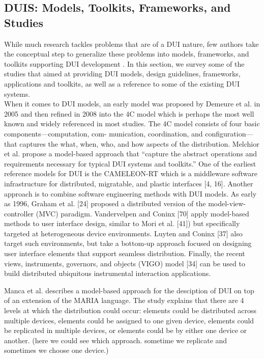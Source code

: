 \subsection{DUIS: Models, Toolkits, Frameworks, and Studies}
While much research tackles problems that are of a DUI nature, few authors take
the conceptual step to generalize these problems into models, frameworks, and
toolkits supporting DUI development \cite{elmqvist2011distributed}. In this
section, we survey some of the studies that aimed at providing DUI models,
design guidelines, frameworks, applications and toolkits, as well as a reference
to some of the existing DUI systems.\\

When it comes to DUI models, an early model was proposed by Demeure et al. in
2005 and then refined in 2008 \cite{demeure20084c} into the 4C model which is
perhaps the most well known and widely
referenced in most studies. The 4C model consists of four basic
components—computation, com- munication, coordination, and configuration—that captures the what, when, who, and how aspects of the distribution. Melchior et al. \cite{melchior2011distributed} propose a model-based approach that ``capture the abstract operations and
requirements necessary for typical DUI systems and toolkits.'' One of the earliest reference models for DUI is the CAMELEON-RT which is a
middleware software infrastructure for distributed, migratable, and plastic interfaces [4, 16]. 
Another approach is to combine software engineering methods with DUI models. As early as 1996, Graham et al. [24] proposed a distributed version of the model-view-controller (MVC) paradigm. Vandervelpen and Coninx [70] apply model-based methods to user interface design, similar to Mori et al. [41]) but specifically targeted at heterogeneous device environments. Luyten and Coninx [37] also target such environments, but take a bottom-up approach focused on designing user interface elements that support seamless distribution. Finally, the recent views, instruments, governors, and objects (VIGO) model [34] can be used to build distributed ubiquitous instrumental interaction applications.

Manca et al. \cite{manca2011distributing} describes a model-based approach for
the desciption of DUI on top of an extension of the MARIA language. The study explains that
there are 4 levels at which the distribution could occur: elements could be
distributed across multiple devices, elements could be assigned to one given
device, elements could be replicated in multiple devices, or elements could be
by either one device or another. (here we could see which approach. sometime we
replicate and sometimes we choose one device.)\\

